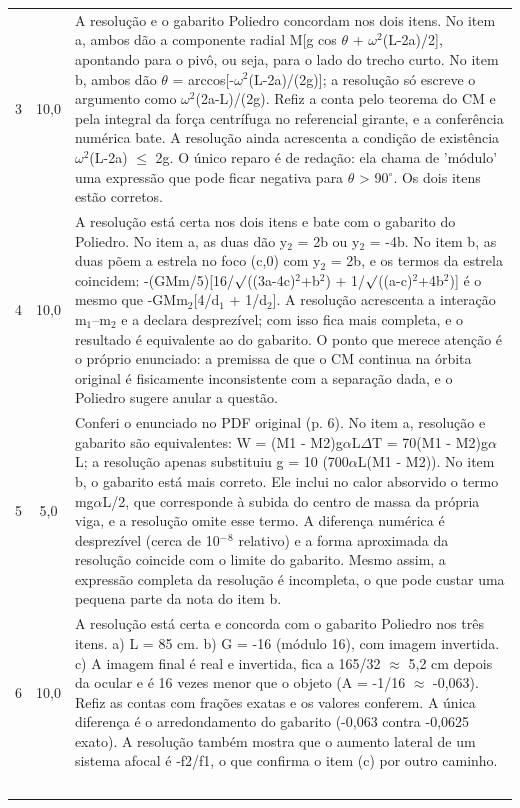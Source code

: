 \documentclass{article}%
\begin{document}
\begin{longtable}{@{}c c p{}@{}}
3 & 10,0 & A resolução e o gabarito Poliedro concordam nos dois itens. No item a, ambos dão a componente radial M{[}g cos $\theta$ + $\omega$$^2$(L-2a)/2{]}, apontando para o pivô, ou seja, para o lado do trecho curto. No item b, ambos dão $\theta$ = arccos{[}-$\omega$$^2$(L-2a)/(2g){]}; a resolução só escreve o argumento como $\omega$$^2$(2a-L)/(2g). Refiz a conta pelo teorema do CM e pela integral da força centrífuga no referencial girante, e a conferência numérica bate. A resolução ainda acrescenta a condição de existência $\omega$$^2$(L-2a) $\leq$ 2g. O único reparo é de redação: ela chama de 'módulo' uma expressão que pode ficar negativa para $\theta$ > 90$^\circ$. Os dois itens estão corretos. \\
4 & 10,0 & A resolução está certa nos dois itens e bate com o gabarito do Poliedro. No item a, as duas dão y$_{2}$ = 2b ou y$_{2}$ = -4b. No item b, as duas põem a estrela no foco (c,0) com y$_{2}$ = 2b, e os termos da estrela coincidem: -(GMm/5){[}16/$\surd$((3a-4c)$^2$+b$^2$) + 1/$\surd$((a-c)$^2$+4b$^2$){]} é o mesmo que -GMm$_{2}${[}4/d$_{1}$ + 1/d$_{2}${]}. A resolução acrescenta a interação m$_{1}$--m$_{2}$ e a declara desprezível; com isso fica mais completa, e o resultado é equivalente ao do gabarito. O ponto que merece atenção é o próprio enunciado: a premissa de que o CM continua na órbita original é fisicamente inconsistente com a separação dada, e o Poliedro sugere anular a questão. \\
5 & 5,0 & Conferi o enunciado no PDF original (p. 6). No item a, resolução e gabarito são equivalentes: W = (M1 - M2)g$\alpha$L$\Delta$T = 70(M1 - M2)g$\alpha$L; a resolução apenas substituiu g = 10 (700$\alpha$L(M1 - M2)). No item b, o gabarito está mais correto. Ele inclui no calor absorvido o termo mg$\alpha$L/2, que corresponde à subida do centro de massa da própria viga, e a resolução omite esse termo. A diferença numérica é desprezível (cerca de 10$^{-}$$^{8}$ relativo) e a forma aproximada da resolução coincide com o limite do gabarito. Mesmo assim, a expressão completa da resolução é incompleta, o que pode custar uma pequena parte da nota do item b. \\
6 & 10,0 & A resolução está certa e concorda com o gabarito Poliedro nos três itens. a) L = 85 cm. b) G = -16 (módulo 16), com imagem invertida. c) A imagem final é real e invertida, fica a 165/32 $\approx$ 5,2 cm depois da ocular e é 16 vezes menor que o objeto (A = -1/16 $\approx$ -0,063). Refiz as contas com frações exatas e os valores conferem. A única diferença é o arredondamento do gabarito (-0,063 contra -0,0625 exato). A resolução também mostra que o aumento lateral de um sistema afocal é -f2/f1, o que confirma o item (c) por outro caminho. \\
$$
\end{longtable}
\end{document}
